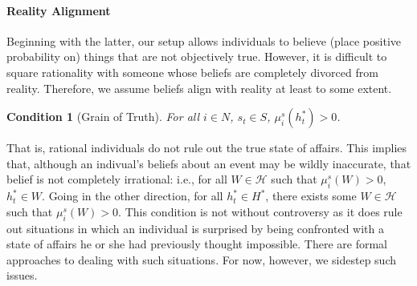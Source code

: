 \documentclass[
11pt,
titlepage,
reqno,
]{article}%
\newtheorem{condition}{Condition}
\theoremstyle{definition}
\begin{document}
	\paragraph{Reality Alignment\label{para: reality alignment}} 
	Beginning with the latter, our setup allows individuals to believe (place positive probability on) things that are not objectively true. 
	However, it is difficult to square rationality with someone whose beliefs are completely divorced from reality. 
	Therefore, we assume beliefs align with reality at least to some extent.
	\begin{condition}[Grain of Truth]\label{cond:grain of truth}
		For all $i\in N$, $s_t\in S$, $\mu_i^s(h^\ast_t)>0$.
	\end{condition}
	\noindent That is, rational individuals do not rule out the true state of affairs. 
	This implies that, although an indivual's beliefs about an event may be wildly inaccurate, that belief is not completely irrational: i.e., for all $W\in \mathcal{H}$ such that $\mu_i^s(W)>0$, $h^\ast_t\in W$. 
	Going in the other direction, for all $h^\ast_t\in H^\ast$, there exists some $W\in \mathcal{H}$ such that $\mu_i^s(W)>0$.
	This condition is not without controversy as it does rule out situations in which an individual is surprised by being confronted with a state of affairs he or she had previously thought impossible.
	There are formal approaches to dealing with such situations.
	For now, however, we sidestep such issues.
	
\end{document}
